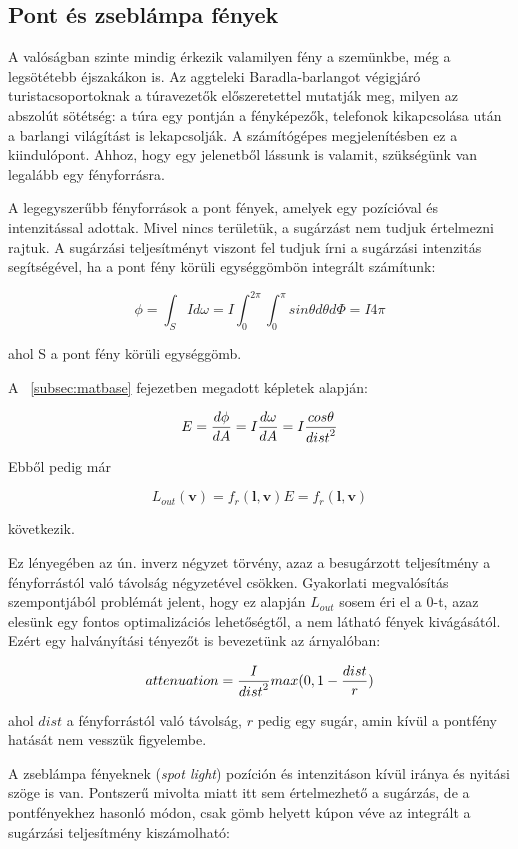 \subsection{Pont és zseblámpa fények}

A valóságban szinte mindig érkezik valamilyen fény a szemünkbe, még a legsötétebb éjszakákon is. Az aggteleki Baradla-barlangot végigjáró turistacsoportoknak a túravezetők előszeretettel mutatják meg, milyen az abszolút sötétség: a túra egy pontján a fényképezők, telefonok kikapcsolása után a barlangi világítást is lekapcsolják. A számítógépes megjelenítésben ez a kiindulópont. Ahhoz, hogy egy jelenetből lássunk is valamit, szükségünk van legalább egy fényforrásra.

A legegyszerűbb fényforrások a pont fények, amelyek egy pozícióval és intenzitással adottak. Mivel nincs területük, a sugárzást nem tudjuk értelmezni rajtuk. A sugárzási teljesítményt viszont fel tudjuk írni a sugárzási intenzitás segítségével, ha a pont fény körüli egységgömbön integrált számítunk:

\[
\phi = \int_S { I d\omega } = I \int_0^{2\pi} { \int_0^\pi { sin\theta d\theta d\Phi } } = I 4\pi
\]

ahol S a pont fény körüli egységgömb.

A ~\ref{subsec:matbase} fejezetben megadott képletek alapján:

\[
E = { { d\phi } \over { dA } } = I { { d\omega } \over { dA } } = I { { cos\theta } \over { dist }^2 }
\]

Ebből pedig már

\[
L_{out}(\mathbf{v}) = f_r(\mathbf{l}, \mathbf{v}) E = f_r(\mathbf{l}, \mathbf{v}) {}
\]

következik.

Ez lényegében az ún. inverz négyzet törvény, azaz a besugárzott teljesítmény a fényforrástól való távolság négyzetével csökken. Gyakorlati megvalósítás szempontjából problémát jelent, hogy ez alapján \(L_{out}\) sosem éri el a 0-t, azaz elesünk egy fontos optimalizációs lehetőségtől, a nem látható fények kivágásától. Ezért egy halványítási tényezőt is bevezetünk az árnyalóban:

\[
attenuation = { I \over {dist}^2 } max(0, 1 - { dist \over r })
\]

ahol \(dist\) a fényforrástól való távolság, \(r\) pedig egy sugár, amin kívül a pontfény hatását nem vesszük figyelembe.

A zseblámpa fényeknek (\textit{spot light}) pozíción és intenzitáson kívül iránya és nyitási szöge is van. Pontszerű mivolta miatt itt sem értelmezhető a sugárzás, de a pontfényekhez hasonló módon, csak gömb helyett kúpon véve az integrált a sugárzási teljesítmény kiszámolható:

